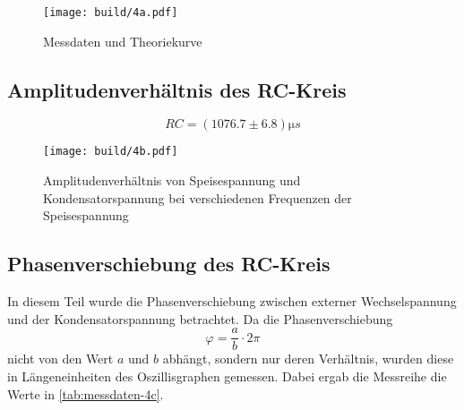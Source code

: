 \begin{figure}[H]
	\centering
	\texttt{[image: build/4a.pdf]}
	\caption{Messdaten und Theoriekurve}
	\label{fig:plot-4a}
\end{figure}


\subsection{Amplitudenverhältnis des RC-Kreis}
\label{sec:4b-auswertung}

\begin{equation}
	RC = (1076.7 \pm 6.8) \si{\micro s}
\end{equation}

\begin{figure}[H]
	\centering
	\texttt{[image: build/4b.pdf]}
	\caption{Amplitudenverhältnis von Speisespannung und Kondensatorspannung bei
	verschiedenen Frequenzen der Speisespannung}
	\label{fig:4b.pdf}
\end{figure}

\subsection{Phasenverschiebung des RC-Kreis}
\label{sec:4c-auswertung}

In diesem Teil wurde die Phasenverschiebung zwischen externer Wechselspannung und der 
Kondensatorspannung betrachtet. Da die Phasenverschiebung
\begin{equation}
	\varphi = \frac{a}{b} \cdot 2\pi
	\label{eqn:4b-phase}
\end{equation}
nicht von den Wert $a$ und $b$ abhängt, sondern nur deren Verhältnis, wurden diese
in Längeneinheiten des Oszillisgraphen gemessen. Dabei ergab die Messreihe die Werte in 
\autoref{tab:messdaten-4c}.

